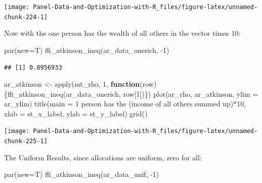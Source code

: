 \documentclass[
]{book}
\newenvironment{Shaded}{\begin{snugshade}}{\end{snugshade}}
\newcommand{\AttributeTok}[1]{\textcolor[rgb]{0.77,0.63,0.00}{#1}}
\newcommand{\ControlFlowTok}[1]{\textcolor[rgb]{0.13,0.29,0.53}{\textbf{#1}}}
\newcommand{\DecValTok}[1]{\textcolor[rgb]{0.00,0.00,0.81}{#1}}
\newcommand{\FunctionTok}[1]{\textcolor[rgb]{0.00,0.00,0.00}{#1}}
\newcommand{\NormalTok}[1]{#1}
\newcommand{\OtherTok}[1]{\textcolor[rgb]{0.56,0.35,0.01}{#1}}
\newcommand{\SpecialCharTok}[1]{\textcolor[rgb]{0.00,0.00,0.00}{#1}}
\newcommand{\StringTok}[1]{\textcolor[rgb]{0.31,0.60,0.02}{#1}}
\begin{document}
\begin{center}\texttt{[image: Panel-Data-and-Optimization-with-R\_files/figure-latex/unnamed-chunk-224-1]} \end{center}

Now with the one person has the wealth of all others in the vector times 10:

\begin{Shaded}
\begin{Highlighting}[]
\FunctionTok{par}\NormalTok{(}\AttributeTok{new=}\NormalTok{T)}
\FunctionTok{ffi\_atkinson\_ineq}\NormalTok{(ar\_data\_onerich, }\SpecialCharTok{{-}}\DecValTok{1}\NormalTok{)}
\end{Highlighting}
\end{Shaded}

\begin{verbatim}
## [1] 0.8956933
\end{verbatim}

\begin{Shaded}
\begin{Highlighting}[]
\NormalTok{ar\_atkinson }\OtherTok{\textless{}{-}} \FunctionTok{apply}\NormalTok{(mt\_rho, }\DecValTok{1}\NormalTok{, }\ControlFlowTok{function}\NormalTok{(row)\{}\FunctionTok{ffi\_atkinson\_ineq}\NormalTok{(ar\_data\_onerich, row[}\DecValTok{1}\NormalTok{])\})}
\FunctionTok{plot}\NormalTok{(ar\_rho, ar\_atkinson, }\AttributeTok{ylim =}\NormalTok{ ar\_ylim)}
\FunctionTok{title}\NormalTok{(}\AttributeTok{main =} \StringTok{\textquotesingle{}1 person has the (income of all others summed up)*10\textquotesingle{}}\NormalTok{, }\AttributeTok{xlab =}\NormalTok{ st\_x\_label, }\AttributeTok{ylab =}\NormalTok{ st\_y\_label)}
\FunctionTok{grid}\NormalTok{()}
\end{Highlighting}
\end{Shaded}

\begin{center}\texttt{[image: Panel-Data-and-Optimization-with-R\_files/figure-latex/unnamed-chunk-225-1]} \end{center}

The Uniform Results, since allocations are uniform, zero for all:

\begin{Shaded}
\begin{Highlighting}[]
\FunctionTok{par}\NormalTok{(}\AttributeTok{new=}\NormalTok{T)}
\FunctionTok{ffi\_atkinson\_ineq}\NormalTok{(ar\_data\_unif, }\SpecialCharTok{{-}}\DecValTok{1}\NormalTok{)}
\end{Highlighting}
\end{Shaded}
\end{document}
